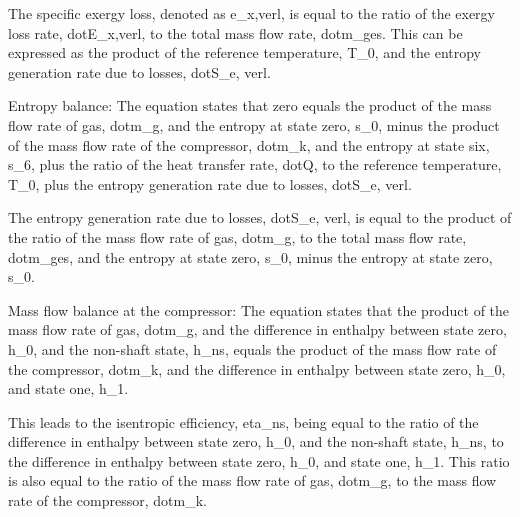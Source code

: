 The specific exergy loss, denoted as e_{x,verl}, is equal to the ratio of the exergy loss rate, dot{E}_{x,verl}, to the total mass flow rate, dot{m}_{ges}. This can be expressed as the product of the reference temperature, T_0, and the entropy generation rate due to losses, dot{S}_{e, verl}.

Entropy balance: The equation states that zero equals the product of the mass flow rate of gas, dot{m}_g, and the entropy at state zero, s_0, minus the product of the mass flow rate of the compressor, dot{m}_k, and the entropy at state six, s_6, plus the ratio of the heat transfer rate, dot{Q}, to the reference temperature, T_0, plus the entropy generation rate due to losses, dot{S}_{e, verl}.

The entropy generation rate due to losses, dot{S}_{e, verl}, is equal to the product of the ratio of the mass flow rate of gas, dot{m}_g, to the total mass flow rate, dot{m}_{ges}, and the entropy at state zero, s_0, minus the entropy at state zero, s_0.

Mass flow balance at the compressor: The equation states that the product of the mass flow rate of gas, dot{m}_g, and the difference in enthalpy between state zero, h_0, and the non-shaft state, h_{ns}, equals the product of the mass flow rate of the compressor, dot{m}_k, and the difference in enthalpy between state zero, h_0, and state one, h_1.

This leads to the isentropic efficiency, eta_{ns}, being equal to the ratio of the difference in enthalpy between state zero, h_0, and the non-shaft state, h_{ns}, to the difference in enthalpy between state zero, h_0, and state one, h_1. This ratio is also equal to the ratio of the mass flow rate of gas, dot{m}_g, to the mass flow rate of the compressor, dot{m}_k.